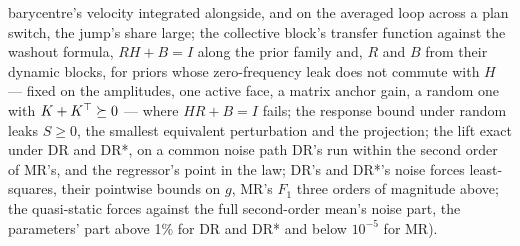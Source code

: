 {barycentre's velocity integrated alongside, and on the averaged loop across a plan switch, the jump's share large; the
collective block's transfer function against the washout formula, $RH + B = I$ along the prior family and, $R$ and
$B$ from their dynamic blocks, for priors whose zero-frequency leak does not commute with $H$ --- fixed on the
amplitudes, one active face, a matrix anchor gain, a random one with $K + K^\top\succeq0$ --- where $HR + B = I$ fails;
the response bound under random leaks $S\ge0$, the smallest equivalent perturbation and the projection; the lift exact
under DR and DR*, on a common noise path DR's run within the second order of MR's, and the regressor's point in the
law; DR's and DR*'s noise forces least-squares, their pointwise bounds on $g$, MR's $F_1$ three orders of magnitude
above; the quasi-static forces against the full second-order mean's noise part, the parameters' part above 1\% for DR
and DR* and below $10^{-5}$ for MR).}

